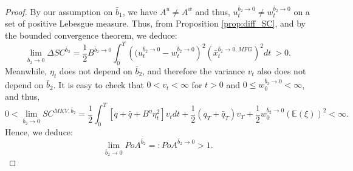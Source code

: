 \documentclass[11pt]{article}
\begin{document}
\begin{proof}
   	By our assumption on $\bar{b}_1$, we have $A^u \neq A^w$ and thus, $u^{\bar{b}_2 \to 0}_t\neq w^{\bar{b}_2 \to 0}_t$ on a set of positive Lebesgue measure. Thus, from Proposition \ref{prop:diff_SC}, and by the bounded convergence theorem, we deduce:
	$$ \lim_{\bar{b}_2 \to 0} \Delta SC^{\bar{b}_2} = \frac{1}{2} B^{\bar{b}_2 \to 0} \int_0^T \left( (u_t^{\bar{b}_2 \to 0} - w_t^{\bar{b}_2 \to 0}\right)^2 \left (\bar{x}_t^{\bar{b}_2 \to 0,MFG} \right)^2 dt \  > 0. $$
	Meanwhile, $\eta_t$ does not depend on $\bar{b}_2$, and therefore the variance $v_t$ also does not depend on $\bar{b}_2$. It is easy to check that $0<v_t<\infty$ for $t>0$ and $0 \leq w^{\bar{b}_2 \to 0}_0 < \infty$, and thus,
	\begin{equation*}
	    0<\lim_{\bar{b}_2 \to 0}SC^{MKV,\bar{b}_2} = \frac{1}{2}\int_0^T \left[q+\bar{q} + B^{\eta} \eta_t^2 \right] v_t dt + \frac{1}{2}(q_T + \bar{q}_T) v_T + \frac{1}{2}w^{\bar{b}_2 \to 0}_0 (\mathbb{E}(\xi))^2<\infty.     
	\end{equation*}
	Hence, we deduce:
	$$ \lim_{\bar{b}_2 \to 0} PoA^{\bar{b}_2} =: PoA^{\bar{b}_2 \to 0} > 1. $$
	

\end{proof}
\end{document}
